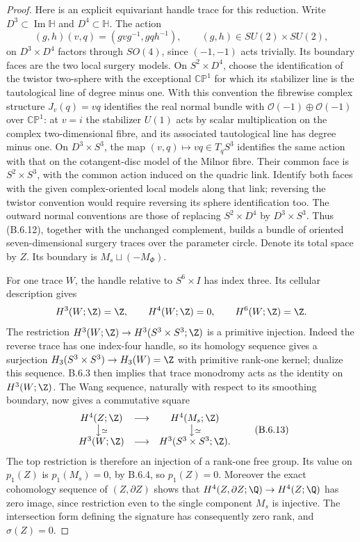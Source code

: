 \begin{proof}
Here is an explicit equivariant handle trace for this reduction.
Write $D^3\subset\operatorname{Im}\mathbb H$ and
$D^4\subset\mathbb H$. The action
\[
 (g,h)(v,q)=(gvg^{-1},gqh^{-1}),\qquad
 (g,h)\in SU(2)\times SU(2),
 \tag{B.6.12}
\]
on $D^3\times D^4$ factors through $SO(4)$, since $(-1,-1)$
acts trivially. Its boundary faces are the two local surgery
models. On $S^2\times D^4$, choose the identification of the
twistor two-sphere with the exceptional $\mathbb{CP}^1$ for
which its stabilizer line is the tautological line of degree
minus one. With this convention the fibrewise complex structure
$J_v(q)=vq$ identifies the real normal bundle with
$\mathcal O(-1)\oplus\mathcal O(-1)$ over $\mathbb{CP}^1$:
at $v=i$ the stabilizer $U(1)$ acts by scalar multiplication
on the complex two-dimensional fibre, and its associated
tautological line has degree minus one. On $D^3\times S^3$,
the map $(v,q)\mapsto vq\in T_qS^3$ identifies the same action
with that on the cotangent-disc model of the Milnor fibre.
Their common face is $S^2\times S^3$, with the common action
induced on the quadric link. Identify both faces with the
given complex-oriented local models along that link; reversing
the twistor convention would require reversing its sphere
identification too. The outward normal conventions
are those of replacing $S^2\times D^4$ by $D^3\times S^3$.
Thus (B.6.12), together with the unchanged complement, builds
a bundle of oriented seven-dimensional surgery traces over
the parameter circle. Denote its total space by $Z$. Its
boundary is $M_s\sqcup(-M_\Phi)$.

For one trace $W$, the handle relative to $S^6\times I$ has
index three. Its cellular description gives
\[
 H^3(W;\Z)=\Z,\qquad H^4(W;\Z)=0,
 \qquad H^6(W;\Z)=\Z.
\]
The restriction $H^3(W;\Z)\to H^3(S^3\times S^3;\Z)$
is a primitive injection. Indeed the reverse trace has one
index-four handle, so its homology sequence gives a surjection
$H_3(S^3\times S^3)\to H_3(W)=\Z$ with primitive rank-one
kernel; dualize this sequence. B.6.3 then implies that trace
monodromy acts as the identity on $H^3(W;\Z)$. The Wang
sequence, naturally with respect to its smoothing boundary,
now gives a commutative square
\[
 \begin{array}{ccc}
 H^4(Z;\Z)&\longrightarrow&H^4(M_s;\Z)\\
 \big\downarrow\scriptstyle\simeq&&
       \big\downarrow\scriptstyle\simeq\\
 H^3(W;\Z)&\longrightarrow&H^3(S^3\times S^3;\Z).
 \end{array}
 \tag{B.6.13}
\]
The top restriction is therefore an injection of a rank-one
free group. Its value on $p_1(Z)$ is $p_1(M_s)=0$, by B.6.4,
so $p_1(Z)=0$. Moreover the exact cohomology sequence of
$(Z,\partial Z)$ shows that
$H^4(Z,\partial Z;\Q)\to H^4(Z;\Q)$ has zero image, since
restriction even to the single component $M_s$ is injective.
The intersection form defining the signature has consequently
zero rank, and $\sigma(Z)=0$.


\end{proof}
